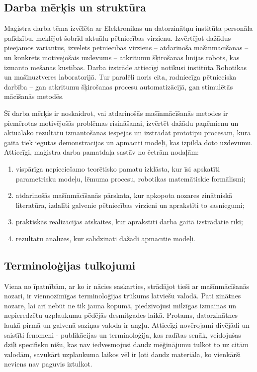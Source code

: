 \documentclass[12pt, a4paper]{article}
\numberwithin{equation}{section} %
\begin{document}
\subsection*{Darba mērķis un struktūra} %

Maģistra darba tēma izvēlēta ar Elektronikas un datorzinātņu institūta personāla palīdzību, meklējot šobrīd aktuālu pētniecības virzienu. Izvērtējot dažādus pieejamos variantus, izvēlēts pētniecības virziens -- atdarinošā mašīnmācīšanās -- un konkrēts motivējošais uzdevums -- atkritumu šķirošanas līnijas robots, kas izmanto mešanas kustības. Darba izstrāde attiecīgi notikusi institūta Robotikas un mašīnuztveres laboratorijā. Tur paralēli noris cita, radniecīga pētnieciska darbība -- gan atkritumu šķirošanas procesu automatizācijā, gan stimulētās mācīšanās metodēs. 

Šī darba mērķis ir noskaidrot, vai atdarinošās mašīnmācīšanās metodes ir piemērotas motivējošās problēmas risināšanai, izvērtēt dažādu paņēmienu un aktuālāko rezultātu izmantošanas iespējas un izstrādāt prototipu procesam, kura gaitā tiek iegūtas demonstrācijas un apmācīti modeļi, kas izpilda doto uzdevumu. Attiecīgi, maģistra darba pamatdaļa sastāv no četrām nodaļām:
\begin{enumerate}
    \item vispārīga nepieciešamo teorētisko pamatu izklāsta, kur īsi apskatīti parametrisku modeļu, lēmuma procesu, robotikas matemātiskie formālismi;
    \item atdarinošās mašīnmācīšanās pārskata, kur apkopota nozares zinātniskā literatūra, izdalīti galvenie pētniecības virzieni un aprakstīti to sasniegumi;
    \item praktiskās realizācijas atskaites, kur aprakstīti darba gaitā izstrādātie rīki;
    \item rezultātu analīzes, kur salīdzināti dažādi apmācītie modeļi.
\end{enumerate}


\subsection*{Terminoloģijas tulkojumi} %

Viena no īpatnībām, ar ko ir nācies saskarties, strādājot tieši ar mašīnmācīšanās nozari, ir viennozīmīgas terminoloģijas trūkums latviešu valodā. Pati zinātnes nozare, lai arī nebūt ne tik jauna kopumā, piedzīvojusi milzīgas izmaiņas un nepieredzētu uzplaukumu pēdējās desmitgades laikā. Protams, datorzinātnes laukā pirmā un galvenā saziņas valoda ir angļu. Attiecīgi novērojami divējādi un saistīti fenomeni - publikācijas un terminoloģija, kas radītas senāk, veidojušas dziļi specifisku nišu, kas nav iedvesmojusi daudz mēģinājumu tulkot to uz citām valodām, savukārt uzplaukuma laikos vēl ir ļoti daudz materiāla, ko vienkārši neviens nav paguvis iztulkot.
\end{document}

